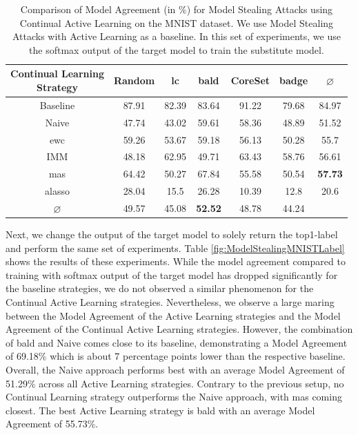 \begin{table}[h]
    \centering
    \begin{tabular}{c | c c c c c | c } 
        \hline
        \diagbox[width=11em]{Active \\ Learning Strategy}{Continual Learning \\ Strategy} & Random & \gls{lc} & \gls{bald} & CoreSet & \gls{badge} & $\varnothing$\\ 
        \hline 
        Baseline & 87.91 & 82.39 & 83.64 & 91.22 & 79.68 & 84.97\\
        \hline
        Naive & 47.74 & 43.02 & 59.61 & 58.36 & 48.89 & 51.52\\
        \gls{ewc} &  59.26 & 53.67 & 59.18 & 56.13 & 50.28 & 55.7\\
        IMM & 48.18 & 62.95 & 49.71 & 63.43 & 58.76 & 56.61 \\
        \gls{mas} &  64.42 & 50.27 & 67.84 & 55.58 & 50.54 & \textbf{57.73}\\
        \gls{alasso} & 28.04 & 15.5 & 26.28 & 10.39 & 12.8 & 20.6\\
        \hline
        $\varnothing$ & 49.57 & 45.08 & \textbf{52.52} & 48.78 & 44.24 & \\
        \hline
    \end{tabular}
    \caption{Comparison of Model Agreement (in \%) for Model Stealing Attacks using Continual Active Learning on the MNIST dataset. We use Model Stealing Attacks with Active Learning as a baseline. In this set of experiments,
    we use the softmax output of the target model to train the substitute model.}
    \label{fig:ModelStealingMNISTSoftmax}
\end{table}

Next, we change the output of the target model to solely return the top1-label and perform the same set of experiments. Table \ref{fig:ModelStealingMNISTLabel} shows the results of these experiments. While the model agreement compared to training with softmax output of the
target model has dropped significantly for the baseline strategies, we do not observed a similar phenomenon for the Continual Active Learning strategies. Nevertheless, we observe a large maring between the Model Agreement of the Active Learning strategies and the Model Agreement
of the Continual Active Learning strategies. However, the combination of \gls{bald} and Naive comes close to its baseline, demonstrating a Model Agreement of 69.18\% which is about 7 percentage points lower than the respective baseline. Overall, the Naive approach performs best with an
average Model Agreement of 51.29\% across all Active Learning strategies. Contrary to the previous setup, no Continual Learning strategy outperforms the Naive approach, with \gls{mas} coming closest. The best Active Learning strategy is \gls{bald} with an average Model Agreement of 55.73\%. \par 

